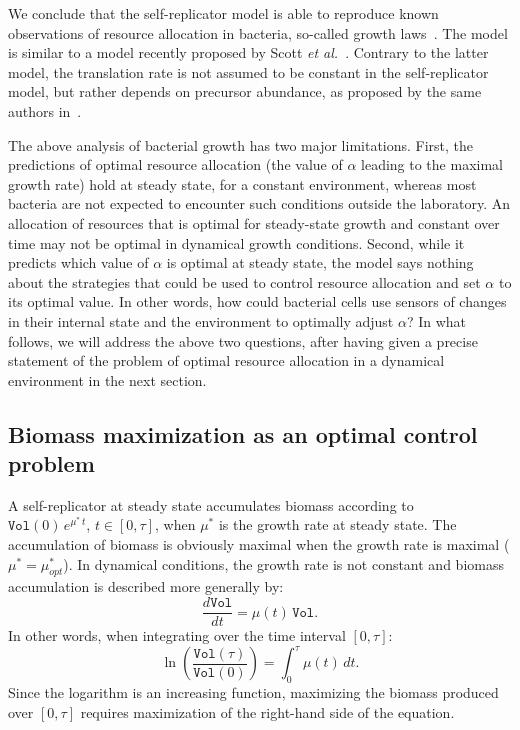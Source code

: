 We conclude that the self-replicator model is able to reproduce known observations of resource allocation in bacteria, so-called growth laws~\cite{scott_interdependence_2010}.
The model is similar to a model recently proposed by Scott \textit{et al.}~\cite{scott_emergence_2014}.
Contrary to the latter model, the translation rate is not assumed to be constant in the self-replicator model, but rather depends on precursor abundance, as proposed by the same authors in~\cite{klumpp_molecular_2013}.

The above analysis of bacterial growth has two major limitations.
First, the predictions of optimal resource allocation (the value of $\alpha$ leading to the maximal growth rate) hold at steady state, for a constant environment, whereas most bacteria are not expected to encounter such conditions outside the laboratory.
An allocation of resources that is optimal for steady-state growth and constant over time may not be optimal in dynamical growth conditions.
Second, while it predicts which value of $\alpha$ is optimal at steady state, the model says nothing about the strategies that could be used to control resource allocation and set $\alpha$ to its optimal value.
In other words, how could bacterial cells use sensors of changes in their internal state and the environment to optimally adjust $\alpha$?
In what follows, we will address the above two questions, after having given a precise statement of the problem of optimal resource allocation in a dynamical environment in the next section. 

\subsection{Biomass maximization as an optimal control problem}
\label{sec:optimalcontrolproblem}

A self-replicator at steady state accumulates biomass according to \\ $\texttt{Vol}(0)\, e^{\mu^*\, t}$, $t\in [0,\tau]$, when $\mu^*$ is the growth rate at steady state. 
The accumulation of biomass is obviously maximal when the growth rate is maximal ($\mu^* = \mu^*_{opt}$).
In dynamical conditions, the growth rate is not constant and biomass accumulation is described more generally by: 
\begin{equation*}
\frac{d\texttt{Vol}}{dt} = \mu(t) \, \texttt{Vol}.
\end{equation*}
In other words, when integrating over the time interval $[0,\tau]$:
\begin{equation}\label{eq:biomassdyn}
\ln \left(\frac{\texttt{Vol}(\tau)}{\texttt{Vol}(0)}\right) =  \int_{0}^{\tau} \mu(t) \, dt.
\end{equation}
Since the logarithm is an increasing function, maximizing the biomass produced over $[0,\tau]$ requires maximization of the right-hand side of the equation.

